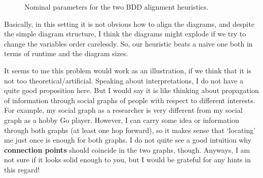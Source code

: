 \documentclass[11pt]{article}
\begin{document}
  \begin{figure}%
    \centering
    \qquad
    \caption{Nominal parameters for the two BDD alignment heuristics.}%
    \label{fig:jUFLP-abs}%
\end{figure}

Basically, in this setting it is not obvious how to align the diagrams, and
despite the simple diagram structure, I think the diagrams might explode if we
try to change the variables order carelessly. So, our heuristic beats a naive
one both in terms of runtime and the diagram sizes.

It seems to me this problem would work as an illustration, if we think that it
 is not too theoretical/artificial. Speaking about interpretations, I do not
 have a quite good proposition here. But I would say it is like thinking about
 propagation of information through social graphs of people with respect to
 different interests. For example, my social graph as a researcher is very
 different from my social graph as a hobby Go player. However, I can carry some
 idea or information through both graphs (at least one hop forward), so it makes
 sense that ‘locating’ me just once is enough for both graphs. I do not quite
 see a good intuition why \textbf{connection points} should coincide in the two graphs,
 though. Anyways, I am not sure if it looks solid enough to you, but I would be
 grateful for any hints in this regard!
\end{document}
